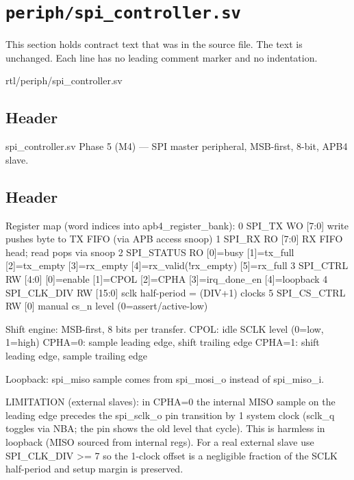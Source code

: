 \section{\texttt{periph/spi\_controller.sv}}\label{ds:mod:spi-controller}

This section holds contract text that was in the source file. The text is unchanged. Each line has no leading comment marker and no indentation.

\begin{relocated}{rtl/periph/spi_controller.sv}

\subsection*{Header}

\begin{textblock}
spi_controller.sv
Phase 5 (M4) — SPI master peripheral, MSB-first, 8-bit, APB4 slave.
\end{textblock}

\subsection*{Header}

\begin{textblock}
Register map (word indices into apb4_register_bank):
  0  SPI_TX      WO [7:0]  write pushes byte to TX FIFO (via APB access snoop)
  1  SPI_RX      RO [7:0]  RX FIFO head; read pops via snoop
  2  SPI_STATUS  RO        [0]=busy [1]=tx_full [2]=tx_empty
                           [3]=rx_empty [4]=rx_valid(!rx_empty) [5]=rx_full
  3  SPI_CTRL    RW [4:0]  [0]=enable [1]=CPOL [2]=CPHA
                           [3]=irq_done_en [4]=loopback
  4  SPI_CLK_DIV RW [15:0] sclk half-period = (DIV+1) clocks
  5  SPI_CS_CTRL RW [0]    manual cs_n level (0=assert/active-low)

Shift engine: MSB-first, 8 bits per transfer.
  CPOL: idle SCLK level (0=low, 1=high)
  CPHA=0: sample leading edge, shift trailing edge
  CPHA=1: shift leading edge, sample trailing edge

Loopback: spi_miso sample comes from spi_mosi_o instead of spi_miso_i.

LIMITATION (external slaves): in CPHA=0 the internal MISO sample on the
leading edge precedes the spi_sclk_o pin transition by 1 system clock
(sclk_q toggles via NBA; the pin shows the old level that cycle).  This is
harmless in loopback (MISO sourced from internal regs).  For a real external
slave use SPI_CLK_DIV >= 7 so the 1-clock offset is a negligible fraction of
the SCLK half-period and setup margin is preserved.


\end{textblock}
\end{relocated}
